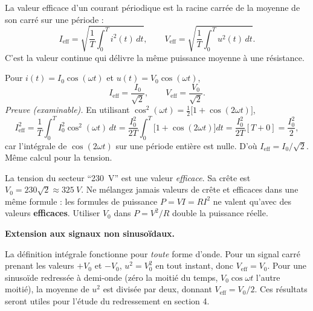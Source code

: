 \documentclass[11pt]{article}
\begin{document}
\begin{definition}
La valeur efficace d'un courant périodique est la racine carrée de la moyenne de son carré sur une période :
\[
I_{\mathrm{eff}}=\sqrt{\dfrac{1}{T}\displaystyle\int_{0}^{T} i^{2}(t)\,dt},
\qquad
V_{\mathrm{eff}}=\sqrt{\dfrac{1}{T}\displaystyle\int_{0}^{T} u^{2}(t)\,dt}.
\]
C'est la valeur continue qui délivre la même puissance moyenne à une résistance.
\end{definition}

\begin{propriete}
Pour $i(t)=I_{0}\cos(\omega t)$ et $u(t)=V_{0}\cos(\omega t)$,
\[
I_{\mathrm{eff}}=\frac{I_{0}}{\sqrt{2}},\qquad V_{\mathrm{eff}}=\frac{V_{0}}{\sqrt{2}}.
\]
\emph{Preuve (examinable).} En utilisant $\cos^{2}(\omega t)=\tfrac{1}{2}\bigl[1+\cos(2\omega t)\bigr]$,
\[
I_{\mathrm{eff}}^{2}=\frac{1}{T}\int_{0}^{T}I_{0}^{2}\cos^{2}(\omega t)\,dt
=\frac{I_{0}^{2}}{2T}\int_{0}^{T}\bigl[1+\cos(2\omega t)\bigr]dt
=\frac{I_{0}^{2}}{2T}\left[T+0\right]=\frac{I_{0}^{2}}{2},
\]
car l'intégrale de $\cos(2\omega t)$ sur une période entière est nulle. D'où $I_{\mathrm{eff}}=I_{0}/\sqrt{2}$. Même calcul pour la tension.
\end{propriete}

\begin{attention}
La tension du secteur ``\SI{230}{V}'' est une valeur \emph{efficace}. Sa crête est $V_{0}=230\sqrt{2}\approx \SI{325}{V}$. Ne mélangez jamais valeurs de crête et efficaces dans une même formule : les formules de puissance $P=VI=RI^{2}$ ne valent qu'avec des valeurs \textbf{efficaces}. Utiliser $V_{0}$ dans $P=V^{2}/R$ double la puissance réelle.
\end{attention}

\textbf{Extension aux signaux non sinusoïdaux.}\par
La définition intégrale fonctionne pour \emph{toute} forme d'onde. Pour un signal carré prenant les valeurs $+V_{0}$ et $-V_{0}$, $u^{2}=V_{0}^{2}$ en tout instant, donc $V_{\mathrm{eff}}=V_{0}$. Pour une sinusoïde redressée à demi-onde (zéro la moitié du temps, $V_{0}\cos\omega t$ l'autre moitié), la moyenne de $u^{2}$ est divisée par deux, donnant $V_{\mathrm{eff}}=V_{0}/2$. Ces résultats seront utiles pour l'étude du redressement en section 4.
\end{document}
